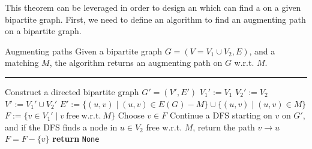 \documentclass[a4paper, 12pt]{report}
\begin{document}
    This theorem can be leveraged in order to design an  which can find a  on a given bipartite graph. First, we need to define an algorithm to find an augmenting path on a bipartite graph.

    \begin{framedalgo}[label={alg:augmenting_path}]{Augmenting paths}
        Given a bipartite graph $G = (V = V_1 \cup V_2, E)$, and a matching $M$, the algorithm returns an augmenting path on $G$ w.r.t. $M$. \\
        \hrule

        \quad
        \begin{algorithmic}[1]
                \State Construct a directed bipartite graph $G' = (V', E')$
                \State $V_1' := V_1$
                \State $V_2' := V_2$
                \State $V' := V_1' \cup V_2'$
                \State $E' := \{(u, v) \mid (u, v) \in E(G) - M\} \cup \{(u, v) \mid (u, v) \in M\}$ 
                \State $F := \{v \in V_1' \mid v \mathrm{\ free \ w.r.t. \ } M\}$
                    \State Choose $v \in F$
                    \State Continue a DFS starting on $v$ on $G'$, and if the DFS finds a node in $u \in V_2$ free w.r.t. $M$, return the path $v \to u$
                    \State $F = F - \{v\}$
                \EndWhile
                \State \textbf{return} \texttt{None}
            \EndFunction
        \end{algorithmic}
    \end{framedalgo}


\end{document}
